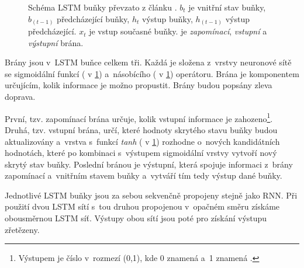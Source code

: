 \begin{figure}[hbt]
    \centering
	\caption{Schéma LSTM buňky převzato z článku \cite{understandingLSTM}. $b_t$ je vnitřní stav buňky, $b_{(t-1)}$ předcházející buňky, $h_t$ výstup buňky, $h_{(t-1)}$ výstup předcházející. $x_t$ je vstup současné buňky.  je \emph{zapomínací},  \emph{vstupní} a  \emph{výstupní} brána.}
	\label{lstm_cell}
\end{figure}

Brány jsou v~LSTM buňce celkem tři. Každá je složena z~vrstvy neuronové sítě se sigmoidální funkcí ( v \ref{lstm_cell}) a~násobícího (\uv{$\times$} v \ref{lstm_cell}) operátoru. Brána je komponentem určujícím, kolik informace je možno propustit. Brány budou popsány zleva doprava.\par
První, tzv. zapomínací brána určuje, kolik vstupní informace je zahozeno\footnote{Výstupem je číslo v~rozmezí (0,1), kde 0 znamená  a~1 znamená .}. Druhá, tzv. vstupní brána, určí, které hodnoty skrytého stavu buňky budou aktualizovány a~vrstva s~funkcí \emph{tanh} ( v \ref{lstm_cell}) rozhodne o~nových kandidátních hodnotách, které po kombinaci s~výstupem sigmoidální vrstvy vytvoří nový skrytý stav buňky. Poslední bránou je výstupní, která spojuje informaci z~brány zapomínací a~vnitřním stavem buňky a~vytváří tím tedy výstup dané buňky.\par
Jednotlivé LSTM buňky jsou za sebou sekvenčně propojeny stejně jako RNN. Při použití dvou LSTM sítí s~tou druhou propojenou v~opačném směru získáme obousměrnou LSTM síť. Výstupy obou sítí jsou poté pro získání výstupu zřetězeny.


